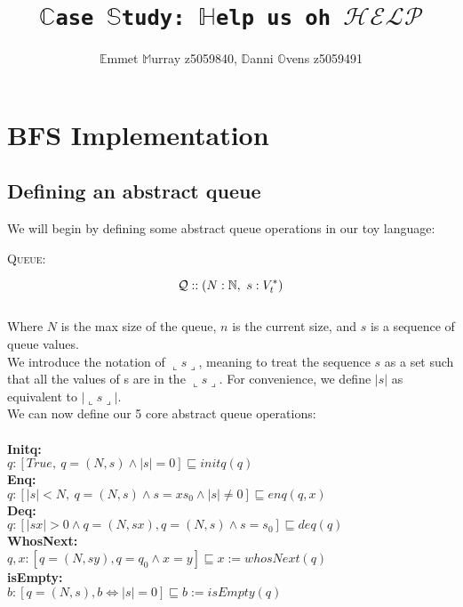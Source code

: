 \documentclass[a4paper]{scrartcl}
\title{\texttt{$\mathbb{C}$ase $\mathbb{S}$tudy: $\mathbb{H}$elp us oh $\mathcal{HELP}$}}
\author{$\mathbb{E}$mmet $\mathbb{M}$urray z5059840, $\mathbb{D}$anni $\mathbb{O}$vens z5059491}
\newcommand{\N}{\mathbb{N}}
\newcommand{\refinedby}{\sqsubseteq} %
\begin{document}
\maketitle
\section{BFS Implementation}
%
\subsection{Defining an abstract queue}
We will begin by defining some abstract queue operations in our toy language: \\
\begin{center}
{\LARGE{\textsc{Queue:}}\normalsize}
\end{center}
\begin{equation*}
\mathcal{Q} :: ( N:\N, ~s:V_{t}^{*} ) \\
\end{equation*} \\
%
Where $N$ is the max size of the queue, $n$ is the current size, and $s$ is a sequence of queue values. \\
%
We introduce the notation of $\llcorner s \lrcorner$, meaning to treat the sequence $s$ as a set such that all the values of s are in the $\llcorner s \lrcorner$. For convenience, we define $|s|$ as equivalent to $|\llcorner s \lrcorner|$.\\
%
We can now define our 5 core abstract queue operations: \\ \\
%
\textbf{Initq:} \\
$q : [True, ~ q = ( N, s) \land |s| = 0] \refinedby initq(q)$ \\
\textbf{Enq:} \\
$q : [|s| < N, ~ q = ( N, s) \land s = xs_0 \land |s| \neq 0] \refinedby enq(q, x)$ \\
\textbf{Deq:} \\
$q : [|sx| > 0 \land q = (N, sx), q = (N, s) \land s = s_0 ] \refinedby  deq(q)$ \\
\textbf{WhosNext:} \\
$q,x : [q = (N, sy), q = q_0 \land x = y] \refinedby x := whosNext(q)$ \\
\textbf{isEmpty:} \\
$b : [q = (N, s), b \iff |s| = 0 ] \refinedby b := isEmpty(q)$\\
%
\end{document}
